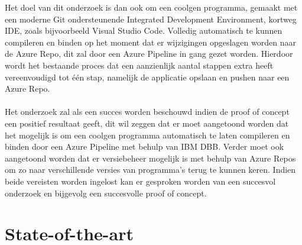 Het doel van dit onderzoek is dan ook om een coolgen programma, gemaakt met een moderne Git ondersteunende Integrated Development Environment, kortweg IDE, zoals bijvoorbeeld Visual Studio Code.
Volledig automatisch te kunnen compileren en binden op het moment dat er wijzigingen opgeslagen worden naar de Azure Repo, dit zal door een Azure Pipeline in gang gezet worden.
Hierdoor wordt het bestaande proces dat een aanzienlijk aantal stappen extra heeft vereenvoudigd tot één stap, namelijk de applicatie opslaan en pushen naar een Azure Repo.
\\ \\
Het onderzoek zal als een succes worden beschouwd indien de proof of concept een positief resultaat geeft, dit wil zeggen dat er moet aangetoond worden dat het mogelijk is om een coolgen programma
automatisch te laten compileren en binden door een Azure Pipeline met behulp van IBM DBB.
Verder moet ook aangetoond worden dat er versiebeheer mogelijk is met behulp van Azure Repos om zo naar verschillende versies van programma's terug te kunnen keren.
Indien beide vereisten worden ingelost kan er gesproken worden van een succesvol onderzoek en bijgevolg een succesvolle proof of concept.


\section{State-of-the-art}%
\label{sec:state-of-the-art}

